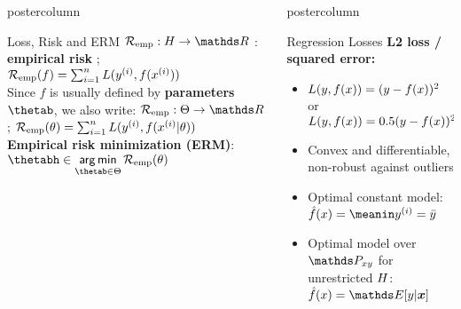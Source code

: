 \documentclass{beamer}
\newlength{\columnheight} %
\begin{document}
\begin{frame}[fragile]{}
\begin{columns}
\begin{column}{.31\textwidth}
\begin{beamercolorbox}[center]{postercolumn}
\begin{minipage}{.98\textwidth}
{\begin{myblock}{Loss, Risk and ERM}
$\riske:  \Hspace \to \R $ : \textbf{empirical risk }; 
$\mathcal{R}_{\text{emp}}(f) = \sum_{i=1}^n L(y^{(i)}, f(x^{(i)}))$\\

Since $f$ is usually defined by \textbf{parameters} $\thetab$, we also write:
$\riske : \Theta \to \R$; $\mathcal{R}_{\text{emp}}(\theta) = \sum_{i=1}^n L(y^{(i)}, f(x^{(i)} | \theta))$\\
  
\textbf{Empirical risk minimization (ERM)}:
$\thetabh \in \argmin \limits_{\thetab \in \Theta} \risket$ 



\end{myblock}





				}
			\end{minipage}
		\end{beamercolorbox}
	\end{column}
	\begin{column}{.31\textwidth}
		\begin{beamercolorbox}[center]{postercolumn}
			\begin{minipage}{.98\textwidth}
				\parbox[t][\columnheight]{\textwidth}{


\begin{myblock}{Regression Losses}
  \textbf{L2 loss / squared error:} 
\begin{itemize}    
  \setlength{\itemindent}{+.3in}
  \item $L(y, f(x)) = (y-f(x))^2$ or $L(y, f(x)) = 0.5 (y-f(x))^2$
  \item Convex and differentiable, non-robust against outliers
  \item Optimal constant model: $\fxh = \meanin \yi =
  \bar{y}$
  \item Optimal model over $\Pxy$ for unrestricted $H$: $\fxh = \E[y | \xv]$
\end{itemize}


\end{myblock}}
\end{minipage}
\end{beamercolorbox}
\end{column}
\end{columns}
\end{frame}
\end{document}
